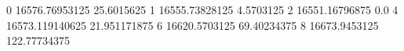 0 16576.76953125 25.6015625
1 16555.73828125 4.5703125
2 16551.16796875 0.0
4 16573.119140625 21.951171875
6 16620.5703125 69.40234375
8 16673.9453125 122.77734375
